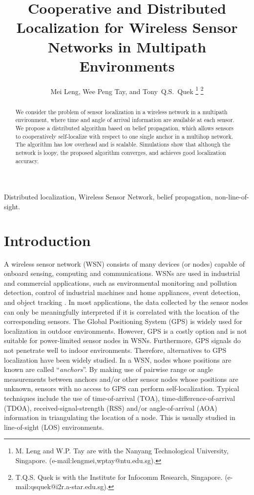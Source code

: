 \documentclass[10pt, twocolumn, final]{IEEEtran}
\title{Cooperative and Distributed Localization for Wireless Sensor Networks in Multipath Environments}
\author{Mei Leng, Wee Peng Tay, and Tony~Q.S.~Quek
\thanks{M. Leng and W.P. Tay are with the Nanyang Technological University, Singapore. (e-mail:lengmei,wptay@ntu.edu.sg).}
\thanks{T.Q.S. Quek is with the Institute for Infocomm Research, Singapore. (e-mail:qsquek@i2r.a-star.edu.sg).}}
\begin{document}
\maketitle

\begin{abstract}
We consider the problem of sensor localization in a wireless network in a multipath environment, where time and angle of arrival information are available at each sensor. We propose a distributed algorithm based on belief propagation, which allows sensors to cooperatively self-localize with respect to one single anchor in a multihop network. The algorithm has low overhead and is scalable. Simulations show that although the network is loopy, the proposed algorithm converges, and achieves good localization accuracy.
\end{abstract}

\begin{IEEEkeywords}
Distributed localization, Wireless Sensor Network, belief propagation, non-line-of-sight.
\end{IEEEkeywords}

\section{Introduction}
A wireless sensor network (WSN) consists of many devices (or nodes) capable of onboard sensing, computing and communications. WSNs are used in industrial and commercial applications, such as environmental monitoring and pollution detection, control of industrial machines and home appliances, event detection, and object tracking \cite{Akyildiz2007,Bulusu2005,Tay2009}. In most applications, the data collected by the sensor nodes can only be meaningfully interpreted if it is correlated with the location of the corresponding sensors. The Global Positioning System (GPS) is widely used for localization in outdoor environments\cite{Bulusu2000}. However, GPS is a costly option and is not suitable for power-limited sensor nodes in WSNs. Furthermore, GPS signals do not penetrate well to indoor environments. Therefore, alternatives to GPS localization have been widely studied\cite{Bulusu2000, Wymeersch2009}. In a WSN, nodes whose positions are known are called ``\emph{anchors}''. By making use of pairwise range or angle measurements between anchors and/or other sensor nodes whose positions are unknown, sensors with no access to GPS can perform self-localization. Typical techniques include the use of time-of-arrival (TOA), time-difference-of-arrival (TDOA), received-signal-strength (RSS) and/or angle-of-arrival (AOA) information in triangulating the location of a node. This is usually studied in line-of-sight (LOS) environments\cite{Sun2005, Mao2007}.
\end{document}
